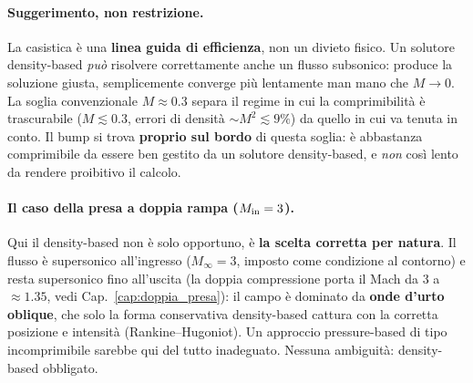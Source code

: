 \paragraph{Suggerimento, non restrizione.} La casistica è una \textbf{linea guida di
efficienza}, non un divieto fisico. Un solutore density-based \emph{può} risolvere
correttamente anche un flusso subsonico: produce la soluzione giusta, semplicemente
converge più lentamente man mano che $M\to0$. La soglia convenzionale $M\approx0.3$ separa
il regime in cui la comprimibilità è trascurabile ($M\!\lesssim\!0.3$, errori di densità
$\sim M^2\!\lesssim\!9\%$) da quello in cui va tenuta in conto. Il bump si trova
\textbf{proprio sul bordo} di questa soglia: è abbastanza comprimibile da essere ben
gestito da un solutore density-based, e \emph{non} così lento da rendere proibitivo il
calcolo.

\paragraph{Il caso della presa a doppia rampa ($M_{\rm in}=3$).} Qui il density-based non
è solo opportuno, è \textbf{la scelta corretta per natura}. Il flusso è supersonico
all'ingresso ($M_\infty=3$, imposto come condizione al contorno) e resta supersonico fino
all'uscita (la doppia compressione porta il Mach da $3$ a $\approx1.35$, vedi
Cap.~\ref{cap:doppia_presa}): il campo è dominato da \textbf{onde d'urto oblique}, che solo
la forma conservativa density-based cattura con la corretta posizione e intensità
(Rankine--Hugoniot). Un approccio pressure-based di tipo incomprimibile sarebbe qui del
tutto inadeguato. Nessuna ambiguità: density-based obbligato.

